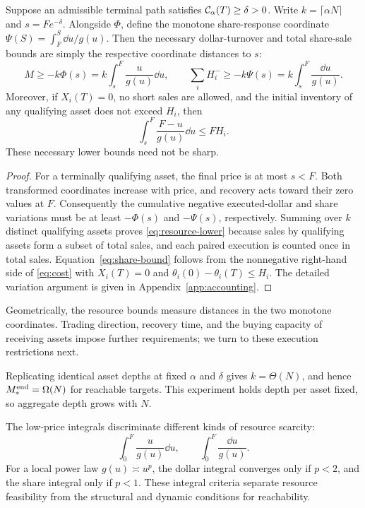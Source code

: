 \documentclass[review,hidelinks,onefignum,onetabnum]{siamonline250211}
\begin{document}
\begin{theorem}\label{thm:resource}
Suppose an admissible terminal path satisfies $\mathcal{C}_\alpha(T)\ge\delta>0$. Write $k=\lceil\alpha N\rceil$ and $s=Fe^{-\delta}$. Alongside $\Phi$, define the monotone share-response coordinate $\Psi(S)=\int_F^S\dd u/g(u)$. Then the necessary dollar-turnover and total share-sale bounds are simply the respective coordinate distances to $s$:
\begin{equation}\label{eq:resource-lower}
\boxed{M\ge -k\Phi(s)=k\int_s^F\frac{u}{g(u)}\dd u,\qquad
\sum_iH_i^-\ge -k\Psi(s)=k\int_s^F\frac{\dd u}{g(u)}.}
\end{equation}
Moreover, if $X_i(T)=0$, no short sales are allowed, and the initial inventory of any qualifying asset does not exceed $H_i$, then
\begin{equation}\label{eq:share-bound}
\boxed{\int_s^F\frac{F-u}{g(u)}\dd u\le FH_i.}
\end{equation}
These necessary lower bounds need not be sharp.
\end{theorem}
\begin{proof}
For a terminally qualifying asset, the final price is at most $s<F$. Both transformed coordinates increase with price, and recovery acts toward their zero values at $F$. Consequently the cumulative negative executed-dollar and share variations must be at least $-\Phi(s)$ and $-\Psi(s)$, respectively. Summing over $k$ distinct qualifying assets proves \eqref{eq:resource-lower} because sales by qualifying assets form a subset of total sales, and each paired execution is counted once in total sales. Equation~\eqref{eq:share-bound} follows from the nonnegative right-hand side of \eqref{eq:cost} with $X_i(T)=0$ and $\theta_i(0)-\theta_i(T)\le H_i$. The detailed variation argument is given in Appendix~\ref{app:accounting}.
\end{proof}

Geometrically, the resource bounds measure distances in the two monotone coordinates. Trading direction, recovery time, and the buying capacity of receiving assets impose further requirements; we turn to these execution restrictions next.

Replicating identical asset depths at fixed $\alpha$ and $\delta$ gives $k=\Theta(N)$, and hence $M_*^{\rm end}=\Omega(N)$ for reachable targets. This experiment holds depth per asset fixed, so aggregate depth grows with $N$.

The low-price integrals discriminate different kinds of resource scarcity:
\begin{equation}\label{eq:lowprice}
\int_0^F\frac{u}{g(u)}\dd u,\qquad
\int_0^F\frac{\dd u}{g(u)}.
\end{equation}
For a local power law $g(u)\asymp u^p$, the dollar integral converges only if $p<2$, and the share integral only if $p<1$. These integral criteria separate resource feasibility from the structural and dynamic conditions for reachability.
\end{document}
